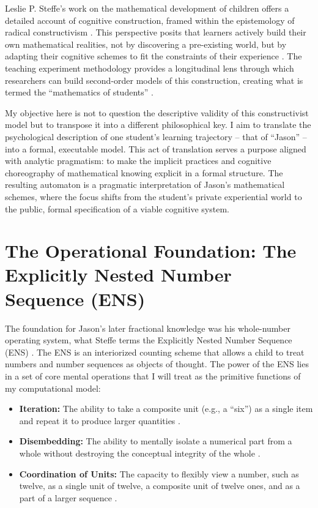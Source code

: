 \documentclass[12pt]{book}
\begin{document}
Leslie P. Steffe's work on the mathematical development of children offers a detailed account of cognitive construction, framed within the epistemology of radical constructivism \parencite {steffe2002new}. This perspective posits that learners actively build their own mathematical realities, not by discovering a pre-existing world, but by adapting their cognitive schemes to fit the constraints of their experience \parencite {von2005contradictions}. The teaching experiment methodology provides a longitudinal lens through which researchers can build second-order models of this construction, creating what is termed the ``mathematics of students'' \parencite {steffe2014teaching}.

My objective here is not to question the descriptive validity of this constructivist model but to transpose it into a different philosophical key. I aim to translate the psychological description of one student's learning trajectory  -- that of ``Jason''  -- into a formal, executable model. This act of translation serves a purpose aligned with analytic pragmatism: to make the implicit practices and cognitive choreography of mathematical knowing explicit in a formal structure. The resulting automaton is a pragmatic interpretation of Jason's mathematical schemes, where the focus shifts from the student's private experiential world to the public, formal specification of a viable cognitive system.

\section{The Operational Foundation: The Explicitly Nested Number Sequence (ENS)}

The foundation for Jason's later fractional knowledge was his whole-number operating system, what Steffe terms the Explicitly Nested Number Sequence (ENS) \parencite {steffe2002new}. The ENS is an interiorized counting scheme that allows a child to treat numbers and number sequences as objects of thought. The power of the ENS lies in a set of core mental operations that I will treat as the primitive functions of my computational model:

\begin{itemize}
    \item \textbf{Iteration:} The ability to take a composite unit (e.g., a ``six'') as a single item and repeat it to produce larger quantities \parencite {steffe2014childrens}.
    \item \textbf{Disembedding:} The ability to mentally isolate a numerical part from a whole without destroying the conceptual integrity of the whole \parencite {steffe2002new}.
    \item \textbf{Coordination of Units:} The capacity to flexibly view a number, such as twelve, as a single unit of twelve, a composite unit of twelve ones, and as a part of a larger sequence \parencite {steffe2004fractional}.
\end{itemize}
\end{document}
